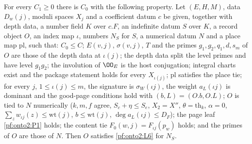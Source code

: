 \begin{theorem}\label{pf:onto2:leafgood}
For every $C_1\ge0$ there is $C_0$ with the following property. Let $(E,H,M)$, data $D_w(j)$, moduli spaces $X_j$ and a coefficient
datum $c$ be given, together with depth data, a number field $K$ over $c.F$, an indefinite datum $S$ over $K$, a record object $O$, an
index map $\iota$, numbers $N_S$ for $S$, a numerical datum $N$ and a place map $\mathrm{pl}$, such that: $C_0\le C$; $E(v,j)$,
$\sigma(v,j)$, $T$ and the primes $g_1,g_2,q_1,d,s_m$ of $O$ are those of the depth data at $\iota(j)$; the depth data split the
level primes and have level $g_1g_2$; the involution of $\OO_E$ is the host conjugation; integral charts exist and the package
statement holds for every $X_{\iota(j)}$; $\mathrm{pl}$ satisfies the place tie; for every $j$, $1\le\iota(j)\le m$, the signature is
$\sigma_W(\iota j)$, the weight $a_L(\iota j)$ is dominant and the good-page conditions hold with $(b,L)=(O.b,O.L)$; $O$ is tied to $N$
numerically ($k,m,f$ agree, $S_c+\eta\le S_e$, $X_2=X''$, $\theta=\mathrm{th}_k$, $\alpha=0$, $\sum_zw_{\iota j}(z)\le\mathrm{wt}(j)$,
$b\le\mathrm{wt}(j)$, $\deg a_L(\iota j)\le D_F$); the page leaf \ref{pf:onto2:P1} holds; the content tie $F_0(w,j)=F_{\iota j}(p_w)$ holds;
and the primes of $O$ are those of $N$. Then $O$ satisfies \ref{pf:onto2:L6} for $N_S$.
\end{theorem}

